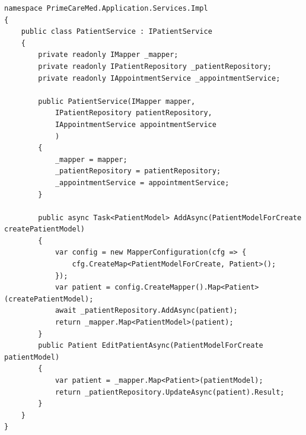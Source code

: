 \begin{lstlisting}[caption={\texttt{PatientService} servis}, label=patientService]
namespace PrimeCareMed.Application.Services.Impl
{
    public class PatientService : IPatientService
    {
        private readonly IMapper _mapper;
        private readonly IPatientRepository _patientRepository;
        private readonly IAppointmentService _appointmentService;

        public PatientService(IMapper mapper,
            IPatientRepository patientRepository,
            IAppointmentService appointmentService
            )
        {
            _mapper = mapper;
            _patientRepository = patientRepository;
            _appointmentService = appointmentService;
        }

        public async Task<PatientModel> AddAsync(PatientModelForCreate createPatientModel)
        {
            var config = new MapperConfiguration(cfg => {
                cfg.CreateMap<PatientModelForCreate, Patient>();
            });
            var patient = config.CreateMapper().Map<Patient>(createPatientModel);
            await _patientRepository.AddAsync(patient);
            return _mapper.Map<PatientModel>(patient);
        }
        public Patient EditPatientAsync(PatientModelForCreate patientModel)
        {
            var patient = _mapper.Map<Patient>(patientModel);
            return _patientRepository.UpdateAsync(patient).Result;
        }
    }
}
\end{lstlisting}

